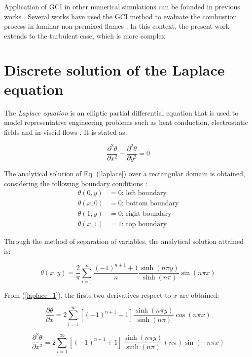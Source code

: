Application of GCI in other  numerical simulations can be founded in previous works  \cite{Ali2009}. Several works have used the GCI method to evaluate the combustion process in laminar non-premixed flames \cite{Kang2016,Claramunt2004}. In this context, the present work extends to the turbulent case, which is more complex

\section{Discrete solution of the Laplace equation}
The \textit{Laplace equation} is an elliptic partial differential equation that is used to model representative engineering problems such as heat conduction, electrostatic fields and in-viscid flows \cite{Chapra2015}. It is stated as:

\begin{equation}
    \frac{\partial^2 \theta}{\partial x^2} + \frac{\partial^2 \theta}{\partial y^2}=0
    \label{laplace}
\end{equation}

The analytical solution of Eq. (\ref{laplace}) over a rectangular domain is  obtained, considering the following boundary conditions \cite{Incropera}:
\begin{align*}
    \theta(0,y)&=0 \text{:  left boundary}\\
    \theta(x,0)&=0 \text{:  bottom boundary}\\
    \theta(1,y)&=0 \text{:  right boundary}\\
    \theta(x,1)&=1 \text{:  top boundary}
\end{align*}

Through the method of separation of variables, the analytical solution attained is: 

\begin{equation}
    \theta(x,y)=\frac{2}{\pi}\sum_{i=1}^\infty \frac{(-1)^{n+1}+1}{n}\frac{\sinh{(n\pi y)}}{\sinh{(n \pi)}}\sin{(n\pi x)}
    \label{laplace_1}
\end{equation}

From (\ref{laplace_1}), the firsts two derivatives respect to $x$ are obtained:

\begin{equation}
    \frac{\partial \theta}{\partial x}=2\sum_{i=1}^\infty \left[(-1)^{n+1}+1\right]\frac{\sinh{(n\pi y)}}{\sinh{(n \pi)}}\cos{(n\pi x)}
    \label{dteta1}
\end{equation}

\begin{equation}
    \frac{\partial^2 \theta}{\partial x^2}=2\sum_{i=1}^\infty \left[(-1)^{n+1}+1\right]\frac{\sinh{(n\pi y)}}{\sinh{(n \pi)}}(n\pi)\sin{(-n\pi x)}
    \label{dteta2}
\end{equation}

